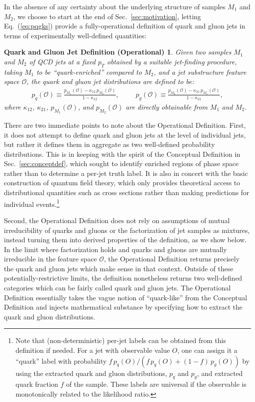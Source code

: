 \documentclass[letterpaper,11pt]{article}
\DeclareRobustCommand{\Sec}[1]{Sec.~\ref{#1}}
\DeclareRobustCommand{\Eq}[1]{Eq.~(\ref{#1})}
\renewcommand{\O}{\mathcal{O}}
\newtheorem*{opdef}{Quark and Gluon Jet Definition (Operational)}
\begin{document}
In the absence of any certainty about the underlying structure of samples $M_1$ and $M_2$, we choose to start at the end of \Sec{sec:motivation}, letting \Eq{eq:pqgks} provide a fully-operational definition of quark and gluon jets in terms of experimentally well-defined quantities:
\begin{framed}
\begin{opdef}
Given two samples $M_1$ and $M_2$ of QCD jets at a fixed $p_T$ obtained by a suitable jet-finding procedure, taking $M_1$ to be ``quark-enriched'' compared to $M_2$, and a jet substructure feature space $\O$, the quark and gluon jet distributions are defined to be:
\begin{align}
\label{eq:opdef}
p_q(\O)\equiv\frac{p_{M_1}(\O)-\kappa_{12}\,p_{M_2}(\O)}{1-\kappa_{12}},&&&p_g(\O)\equiv\frac{p_{M_2}(\O)-\kappa_{21}\,p_{M_1}(\O)}{1-\kappa_{21}},
\end{align}
where $\kappa_{12}$, $\kappa_{21}$, $p_{M_1}(\O)$, and $p_{M_2}(\O)$ are directly obtainable from $M_1$ and $M_2$.
\end{opdef}
\end{framed}

There are two immediate points to note about the Operational Definition.
%
First, it does not attempt to define quark and gluon jets at the level of individual jets, but rather it defines them in aggregate as two well-defined probability distributions.
%
This is in keeping with the spirit of the Conceptual Definition in \Sec{sec:conceptdef}, which sought to identify enriched regions of phase space rather than to determine a per-jet truth label.
%
It is also in concert with the basic construction of quantum field theory, which only provides theoretical access to distributional quantities such as cross sections rather than making predictions for individual events.\footnote{Note that (non-deterministic) per-jet labels can be obtained from this definition if needed. For a jet with observable value $O$, one can assign it a ``quark'' label with probability $f\, p_q(O)/(f\, p_q(O) + (1-f)\, p_g(O))$ by using the extracted quark and gluon distributions, $p_q$ and $p_g$, and extracted quark fraction $f$ of the sample. These labels are universal if the observable is monotonically related to the likelihood ratio.}


Second, the Operational Definition does not rely on assumptions of mutual irreducibility of quarks and gluons or the factorization of jet samples as mixtures, instead turning them into derived properties of the definition, as we show below.
%
In the limit where factorization holds and quarks and gluons are mutually irreducible in the feature space $\mathcal O$, the Operational Definition returns precisely the quark and gluon jets which make sense in that context.
%
Outside of these potentially-restrictive limits, the definition nonetheless returns two well-defined categories which can be fairly called quark and gluon jets.
%
The Operational Definition essentially takes the vague notion of ``quark-like'' from the Conceptual Definition and injects mathematical substance by specifying how to extract the quark and gluon distributions.
\end{document}
